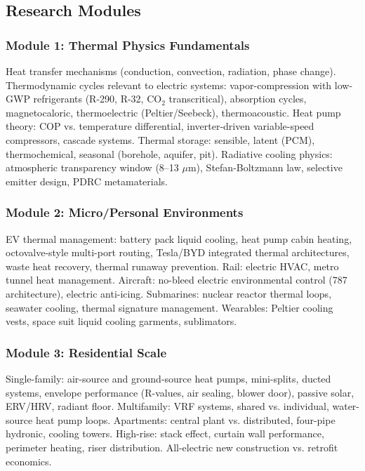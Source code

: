 \documentclass[11pt,letterpaper]{article}
\begin{document}
\subsection{Research Modules}

\subsubsection{Module 1: Thermal Physics Fundamentals}
Heat transfer mechanisms (conduction, convection, radiation, phase change). Thermodynamic cycles relevant to electric systems: vapor-compression with low-GWP refrigerants (R-290, R-32, CO$_2$ transcritical), absorption cycles, magnetocaloric, thermoelectric (Peltier/Seebeck), thermoacoustic. Heat pump theory: COP vs. temperature differential, inverter-driven variable-speed compressors, cascade systems. Thermal storage: sensible, latent (PCM), thermochemical, seasonal (borehole, aquifer, pit). Radiative cooling physics: atmospheric transparency window (8--13 $\mu$m), Stefan-Boltzmann law, selective emitter design, PDRC metamaterials.

\subsubsection{Module 2: Micro/Personal Environments}
EV thermal management: battery pack liquid cooling, heat pump cabin heating, octovalve-style multi-port routing, Tesla/BYD integrated thermal architectures, waste heat recovery, thermal runaway prevention. Rail: electric HVAC, metro tunnel heat management. Aircraft: no-bleed electric environmental control (787 architecture), electric anti-icing. Submarines: nuclear reactor thermal loops, seawater cooling, thermal signature management. Wearables: Peltier cooling vests, space suit liquid cooling garments, sublimators.

\subsubsection{Module 3: Residential Scale}
Single-family: air-source and ground-source heat pumps, mini-splits, ducted systems, envelope performance (R-values, air sealing, blower door), passive solar, ERV/HRV, radiant floor. Multifamily: VRF systems, shared vs. individual, water-source heat pump loops. Apartments: central plant vs. distributed, four-pipe hydronic, cooling towers. High-rise: stack effect, curtain wall performance, perimeter heating, riser distribution. All-electric new construction vs. retrofit economics.
\end{document}
